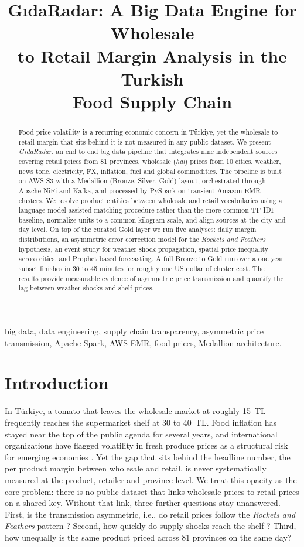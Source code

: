 \documentclass[conference]{IEEEtran}
\title{GıdaRadar: A Big Data Engine for Wholesale\\to Retail Margin Analysis in the Turkish\\Food Supply Chain}
\author{
\IEEEauthorblockN{Azmi Yağlı, Abdullah Zengin, Hidayet Ersin Dursun}
\IEEEauthorblockA{\textit{Istanbul Technical University}\\
BVA 504E Big Data Technologies and Applications}
}
\begin{document}
\maketitle

\begin{abstract}
Food price volatility is a recurring economic concern in Türkiye, yet the wholesale to retail margin that sits behind it is not measured in any public dataset. We present \textit{GıdaRadar}, an end to end big data pipeline that integrates nine independent sources covering retail prices from 81 provinces, wholesale (\textit{hal}) prices from 10 cities, weather, news tone, electricity, FX, inflation, fuel and global commodities. The pipeline is built on AWS S3 with a Medallion (Bronze, Silver, Gold) layout, orchestrated through Apache NiFi and Kafka, and processed by PySpark on transient Amazon EMR clusters. We resolve product entities between wholesale and retail vocabularies using a language model assisted matching procedure rather than the more common TF-IDF baseline, normalize units to a common kilogram scale, and align sources at the city and day level. On top of the curated Gold layer we run five analyses: daily margin distributions, an asymmetric error correction model for the \textit{Rockets and Feathers} hypothesis, an event study for weather shock propagation, spatial price inequality across cities, and Prophet based forecasting. A full Bronze to Gold run over a one year subset finishes in 30 to 45 minutes for roughly one US dollar of cluster cost. The results provide measurable evidence of asymmetric price transmission and quantify the lag between weather shocks and shelf prices.
\end{abstract}

\begin{IEEEkeywords}
big data, data engineering, supply chain transparency, asymmetric price transmission, Apache Spark, AWS EMR, food prices, Medallion architecture.
\end{IEEEkeywords}

\section{Introduction}

In Türkiye, a tomato that leaves the wholesale market at roughly 15~TL frequently reaches the supermarket shelf at 30 to 40~TL. Food inflation has stayed near the top of the public agenda for several years, and international organizations have flagged volatility in fresh produce prices as a structural risk for emerging economies \cite{hlpe2011,faooutlook}. Yet the gap that sits behind the headline number, the per product margin between wholesale and retail, is never systematically measured at the product, retailer and province level. We treat this opacity as the core problem: there is no public dataset that links wholesale prices to retail prices on a shared key. Without that link, three further questions stay unanswered. First, is the transmission asymmetric, i.e., do retail prices follow the \emph{Rockets and Feathers} pattern \cite{bacon1991,peltzman2000,vct1998}? Second, how quickly do supply shocks reach the shelf \cite{deaton1999}? Third, how unequally is the same product priced across 81 provinces on the same day?
\end{document}
